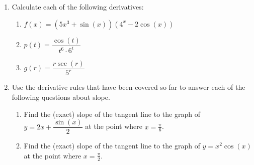\documentclass[12pt]{exam}
\begin{document}
\begin{enumerate}
\begin{enumerate}
	\vfill
	
	\newpage
	
	\item Use the Product Rule to find a formula for $R'(p)$ in terms of $p$, $f(p)$, and $f'(p)$.
	
	\vfill
	
	\item At what rate is the monthly revenue changing when the price of a cake is set to $p=20$?
	
	\vfill
	
	\item Based on your answer to the previous part, what should the company do? Should it raise the price of a cake? Keep it the same? Or decrease the price of a cake? What would lead to higher monthly revenue? Why?

\vfill

\end{enumerate}
\newpage


\item Calculate each of the following derivatives:

\begin{enumerate}

\item $f(x)=(5x^3+\sin(x))(4^x-2\cos(x))$

\vfill

\item $p(t)=\dfrac{\cos(t)}{t^6\cdot 6^t}$

\vfill

\item $g(r)=\dfrac{r\sec(r)}{5^r}$

\vfill

\end{enumerate}

\newpage


\item Use the derivative rules that have been covered so far to answer each of the following questions about slope.

\begin{enumerate}

\item Find the (exact) slope of the tangent line to the graph of $y=2x+\dfrac{\sin(x)}{2}$ at the point where $x=\frac{\pi}{6}$. 

\vfill

\item Find the (exact) slope of the tangent line to the graph of $y=x^2\cos(x)$ at the point where $x=\frac{\pi}{2}$.


\end{enumerate}
\end{enumerate}
\end{document}
